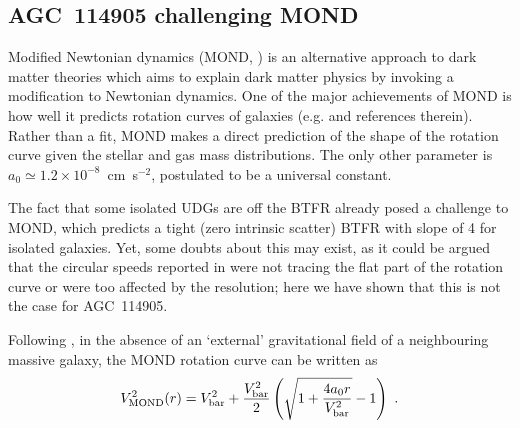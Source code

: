 \documentclass[fleqn,usenatbib]{mnras}
\begin{document}


\subsection{AGC~114905 challenging MOND}
\label{sec:mond}
Modified Newtonian dynamics (MOND, \citealt{mond,sanders_mond_review}) is an alternative approach to dark matter theories which aims to explain dark matter physics by invoking a modification to Newtonian dynamics. One of the major achievements of MOND is how well it predicts rotation curves of galaxies (e.g. \citealt{sanders_mond_review,mond_famaey_review} and references therein). Rather than a fit, MOND makes a direct prediction of the shape of the rotation curve given the stellar and gas mass distributions. The only other parameter is $a_0 \simeq 1.2\times 10^{-8}$~cm~s$^{-2}$, postulated to be a universal constant.

The fact that some isolated UDGs are off the BTFR already posed a challenge to MOND, which predicts a tight (zero intrinsic scatter) BTFR with slope of 4 for isolated galaxies. Yet, some doubts about this may exist, as it could be argued that the circular speeds reported in \citet{huds2019,huds2020} were not tracing the flat part of the rotation curve or were too affected by the resolution; here we have shown that this is not the case for AGC~114905. 

Following \citet{gentile2008}, in the absence of an `external' gravitational field of a neighbouring massive galaxy, the MOND rotation curve can be written as 
\begin{equation}
  V^2_{\rm MOND}(r) =  V_{\rm bar}^2  + \dfrac{V_{\rm bar}^2}{2} \left(\sqrt{1+\dfrac{4 a_0 r}{V_{\rm bar}^2}}-1 \right)~.
\end{equation}
\end{document}
